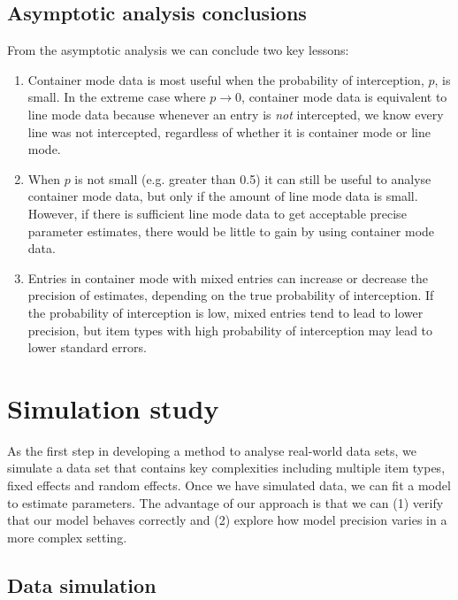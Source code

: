 \documentclass{article}
\begin{document}
\subsection{Asymptotic analysis conclusions}

From the asymptotic analysis we can conclude two key lessons:
\begin{enumerate}
\item Container mode data is most useful when the probability of interception, \(p\), is small. In the extreme case where \(p\rightarrow 0\), container mode data is equivalent to line mode data because whenever an entry is \emph{not} intercepted, we know every line was not intercepted, regardless of whether it is container mode or line mode. 
\item When \(p\) is not small (e.g. greater than 0.5) it can still be useful to analyse container mode data, but only if the amount of line mode data is small. However, if there is sufficient line mode data to get acceptable precise parameter estimates, there would be little to gain by using container mode data.
\item Entries in container mode with mixed entries can increase or decrease the precision of estimates, depending on the true probability of interception. If the probability of interception is low, mixed entries tend to lead to lower precision, but item types with high probability of interception may lead to lower standard errors.
\end{enumerate}


\section{Simulation study}
As the first step in developing a method to analyse real-world data sets, we simulate a data set that contains key complexities including multiple item types, fixed effects and random effects. Once we have simulated data, we can fit a model to estimate parameters. The advantage of our approach is that we can (1) verify that our model behaves correctly and (2) explore how model precision varies in a more complex setting.

\subsection{Data simulation}
\end{document}
